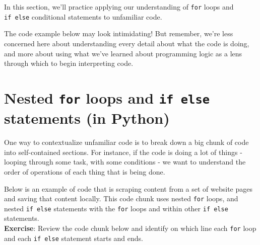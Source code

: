 \documentclass[
]{book}
\begin{document}
In this section, we'll practice applying our understanding of \texttt{for} loops and \texttt{if\ else} conditional statements to unfamiliar code.

The code example below may look intimidating! But remember, we're less concerned here about understanding every detail about what the code is doing, and more about using what we've learned about programming logic as a lens through which to begin interpreting code.

\section{\texorpdfstring{Nested \texttt{for} loops and \texttt{if\ else} statements (in Python)}{Nested for loops and if else statements (in Python)}}\label{nested-for-loops-and-if-else-statements-in-python}

One way to contextualize unfamiliar code is to break down a big chunk of code into self-contained sections. For instance, if the code is doing a lot of things - looping through some task, with some conditions - we want to understand the order of operations of each thing that is being done.

Below is an example of code that is scraping content from a set of website pages and saving that content locally. This code chunk uses nested \texttt{for} loops, and nested \texttt{if\ else} statements with the \texttt{for} loops and within other \texttt{if\ else} statements.\\

\textbf{Exercise}: Review the code chunk below and identify on which line each \texttt{for} loop and each \texttt{if\ else} statement starts and ends.
\end{document}
